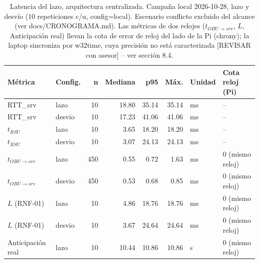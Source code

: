 \begin{table}[H]
\centering
\caption{Latencia del lazo, arquitectura centralizada. Campaña local 2026-10-28, lazo y desvío (10 repeticiones c/u, config=local). Escenario conflicto excluido del alcance (ver docs/CRONOGRAMA.md). Las métricas de dos relojes ($t_{OBU\to srv}$, $L$, Anticipación real) llevan la cota de error de reloj del lado de la Pi (chrony); la laptop sincroniza por w32time, cuya precisión no está caracterizada [REVISAR con asesor] -- ver sección 8.4.}
\label{tab:latencia_campana_centralizada}
\small
\begin{tabular}{llrrrrll}
\toprule
\textbf{Métrica} & \textbf{Config.} & \textbf{n} & \textbf{Mediana} & \textbf{p95} & \textbf{Máx.} & \textbf{Unidad} & \textbf{Cota reloj (Pi)} \\
\midrule
RTT\_srv & lazo & 10 & 18.80 & 35.14 & 35.14 & ms & -- \\
RTT\_srv & desvio & 10 & 17.23 & 41.06 & 41.06 & ms & -- \\
$t_{RSU}$ & lazo & 10 & 3.65 & 18.20 & 18.20 & ms & -- \\
$t_{RSU}$ & desvio & 10 & 3.07 & 24.13 & 24.13 & ms & -- \\
$t_{OBU\to srv}$ & lazo & 450 & 0.55 & 0.72 & 1.63 & ms & 0 (mismo reloj) \\
$t_{OBU\to srv}$ & desvio & 450 & 0.53 & 0.68 & 0.85 & ms & 0 (mismo reloj) \\
$L$ (RNF-01) & lazo & 10 & 4.86 & 18.76 & 18.76 & ms & 0 (mismo reloj) \\
$L$ (RNF-01) & desvio & 10 & 3.67 & 24.64 & 24.64 & ms & 0 (mismo reloj) \\
Anticipación real & lazo & 10 & 10.44 & 10.86 & 10.86 & s & 0 (mismo reloj) \\
\bottomrule
\end{tabular}
\end{table}
